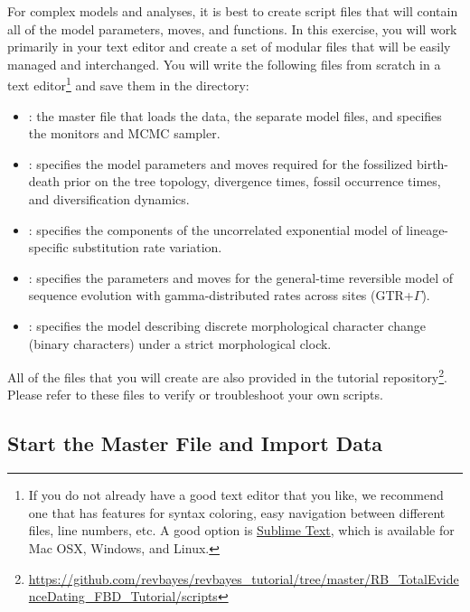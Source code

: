For complex models and analyses, it is best to create \Rev script files that will contain all of the model parameters, moves, and functions. 
In this exercise, you will work primarily in your text editor and create a set of modular files that will be easily managed and interchanged.
You will write the following files from scratch in a text editor\footnote{If you do not already have a good text editor that you like, we recommend one that has features for syntax coloring, easy navigation between different files, line numbers, etc.
A good option is \href{http://www.sublimetext.com/}{Sublime Text}, which is available for Mac OSX, Windows, and Linux.} and save them in the  directory:
\begin{itemize}[noitemsep,topsep=0pt]
\item {}: the master \Rev file that loads the data, the separate model files, and specifies the monitors and MCMC sampler.
\item {}: specifies the model parameters and moves required for the fossilized birth-death prior on the tree topology, divergence times, fossil occurrence times, and diversification dynamics.
\item {}: specifies the components of the uncorrelated exponential model of lineage-specific substitution rate variation.
\item {}: specifies the parameters and moves for the general-time reversible model of sequence evolution with gamma-distributed rates across sites (GTR+$\Gamma$).
\item {}: specifies the model describing discrete morphological character change (binary characters) under a strict morphological clock. 
\end{itemize}

All of the files that you will create are also provided in the \RevBayes tutorial repository\footnote{\url{https://github.com/revbayes/revbayes_tutorial/tree/master/RB_TotalEvidenceDating_FBD_Tutorial/scripts}}. 
Please refer to these files to verify or troubleshoot your own scripts. 


\bigskip
\subsection{Start the Master \Rev File and Import Data}\label{subsect:RB-StartMasterRev}



